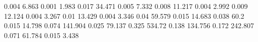 0.004      6.863      %
0.001      1.983      %
0.017      34.471     %
0.005      7.332      %
0.008      11.217     %
0.004      2.992      %
0.009      12.124     %
0.004      3.267      %
0.01       13.429     %
0.004      3.346      %
0.04       59.579     %
0.015      14.683     %
0.038      60.2       %
0.015      14.798     %
0.074      141.904    %
0.025      79.137     %
0.325      534.72     %
0.138      134.756    %
0.172      242.807    %
0.071      61.784     %
0.015      3.438      %
